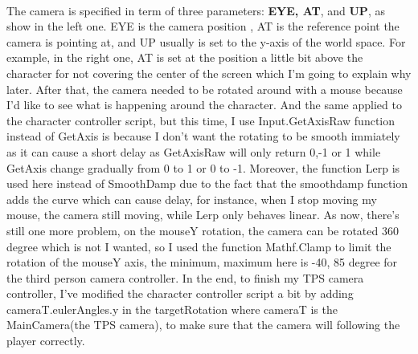 \documentclass[a4paper, 13pt]{extarticle}
\begin{document}
  	\\[0.05cm]
 	 The camera is specified in term of three parameters: {\bfseries EYE, AT}, and {\bfseries UP}, as show in the left one. EYE is the camera position , AT is the reference point the camera is pointing at, and UP usually is set to the y-axis of the world space. For example, in the right one, AT is set at the position a little bit above the character for not covering the center of the screen which I'm going to explain why later.
 	 After that, the camera needed to be rotated around with a mouse because I'd like to see what is happening around the character. And the same applied to the character controller script, but this time, I use Input.GetAxisRaw function instead of GetAxis is because I don't want the rotating to be smooth immiately as it can cause a short delay as GetAxisRaw will only return 0,-1 or 1 while GetAxis change gradually from 0 to 1 or 0 to -1.  
 	 Moreover, the function Lerp is used here instead of SmoothDamp due to the fact that the smoothdamp function adds the curve which can cause delay, for instance, when I stop moving my mouse, the camera still moving, while Lerp only behaves linear. As now, there's still one more problem, on the mouseY rotation, the camera can be rotated 360 degree which is not I wanted, so I used the function Mathf.Clamp to limit the rotation of the mouseY axis, the minimum, maximum here is -40, 85 degree for the third person camera controller. In the end, to finish my TPS camera controller, I've modified the character controller script a bit by adding cameraT.eulerAngles.y in the targetRotation where cameraT is the MainCamera(the TPS camera), to make sure that the camera will following the player correctly.
 	 
\end{document}
